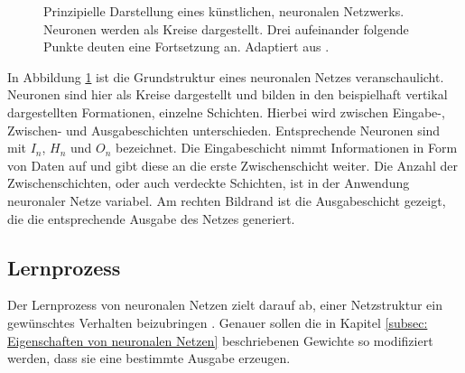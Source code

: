 \begin{figure}[H]
				\caption{Prinzipielle Darstellung eines künstlichen, neuronalen Netzwerks. Neuronen werden als Kreise dargestellt. Drei aufeinander folgende Punkte deuten eine Fortsetzung an. Adaptiert aus \cite{neuron}.}
				\label{fig: neuronales netz }
		\end{figure}
	
		
		In Abbildung \ref{fig: neuronales netz } ist die Grundstruktur eines neuronalen Netzes veranschaulicht. Neuronen sind hier als Kreise dargestellt und bilden in den beispielhaft vertikal dargestellten Formationen, einzelne Schichten. Hierbei wird zwischen Eingabe-, Zwischen- und Ausgabeschichten unterschieden. Entsprechende Neuronen sind mit $I_n$, $H_n$ und $O_n$ bezeichnet. Die Eingabeschicht nimmt Informationen in Form von Daten auf und gibt diese an die erste Zwischenschicht weiter. Die Anzahl der Zwischenschichten, oder auch verdeckte Schichten, ist in der Anwendung neuronaler Netze variabel. Am rechten Bildrand ist die Ausgabeschicht gezeigt, die die entsprechende Ausgabe des Netzes generiert.  
	
		\subsection{Lernprozess}
		Der Lernprozess von neuronalen Netzen zielt darauf ab, einer Netzstruktur ein gewünschtes Verhalten beizubringen \cite{proba}. Genauer sollen die in Kapitel \ref{subsec: Eigenschaften von neuronalen Netzen} beschriebenen Gewichte so modifiziert werden, dass sie eine bestimmte Ausgabe erzeugen.\\
		

